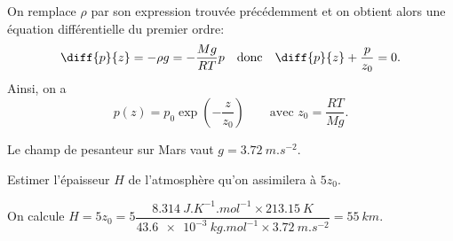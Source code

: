 \reponse{\reponseC{}}

\begin{corrige}
On remplace $\rho$ par son expression trouvée précédemment et on obtient alors une équation différentielle du premier ordre:
\[
\diff{p}{z}=-\rho g=-\frac{Mg}{RT}p
\quad\text{donc}\quad
\diff{p}{z}+\frac{p}{z_{0}}=0.
\]
Ainsi, on a
\[
p(z)=p_0\exp\left(-\dfrac{z}{z_{0}}\right)\ensuremath{\qquad}\text{avec }z_{0}=\frac{RT}{Mg}.
\]
\end{corrige}



Le champ de pesanteur sur Mars vaut $g=\SI{3.72}{m.s^{-2}}$. 


\begin{enonce}
Estimer l'épaisseur $H$ de l'atmosphère qu'on assimilera à $5z_{0}$.
\end{enonce}


\begin{corrige}
On calcule $H=5z_{0}=5\dfrac{\SI{8.314}{J.K^{-1}.mol^{-1}}\times\SI{213.15}{K}}{\SI{43.6e-3}{kg.mol^{-1}}\times\SI{3.72}{m.s^{-2}}}=\SI{55}{km}$.
\end{corrige}


\finEntrainement



\newpage







\hauteurLargeurCadreReponse		{7mm}{7cm}
\initialisationEntrainement

